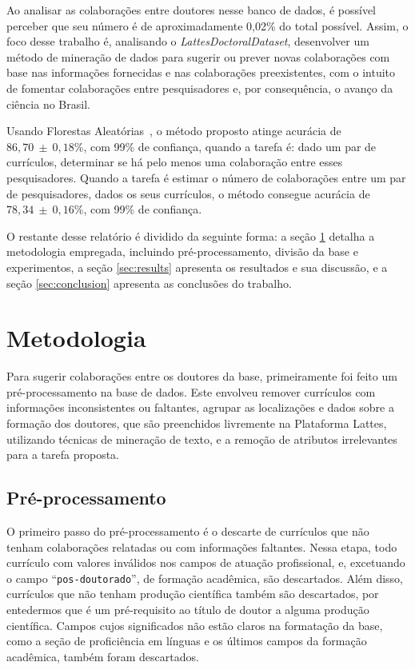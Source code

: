 \documentclass[12pt]{article}
\begin{document}
Ao analisar as colaborações entre doutores nesse banco de dados, é possível perceber que seu número é de aproximadamente 0,02\% do total possível.
Assim, o foco desse trabalho é, analisando o \emph{LattesDoctoralDataset}, desenvolver um método de mineração de dados para sugerir ou prever novas colaborações com base nas informações fornecidas e nas colaborações preexistentes, com o intuito de fomentar colaborações entre pesquisadores e, por consequência, o avanço da ciência no Brasil.

Usando Florestas Aleatórias~\cite{random-forests}, o método proposto atinge acurácia de $86,70~\pm~0,18$\%, com 99\% de confiança, quando a tarefa é: dado um par de currículos, determinar se há pelo menos uma colaboração entre esses pesquisadores.
Quando a tarefa é estimar o número de colaborações entre um par de pesquisadores, dados os seus currículos, o método consegue acurácia de $78,34~\pm~0,16$\%, com 99\% de confiança.

O restante desse relatório é dividido da seguinte forma: a seção \ref{sec:methods} detalha a metodologia empregada, incluindo pré-processamento, divisão da base e experimentos, a seção \ref{sec:results} apresenta os resultados e sua discussão, e a seção \ref{sec:conclusion} apresenta as conclusões do trabalho.

\section{Metodologia}
\label{sec:methods}

Para sugerir colaborações entre os doutores da base, primeiramente foi feito um pré-processamento na base de dados.
Este envolveu remover currículos com informações inconsistentes ou faltantes, agrupar as localizações e dados sobre a formação dos doutores, que são preenchidos livremente na Plataforma Lattes, utilizando técnicas de mineração de texto, e a remoção de atributos irrelevantes para a tarefa proposta.

\subsection{Pré-processamento}
\label{sec:preprocess}

O primeiro passo do pré-processamento é o descarte de currículos que não tenham colaborações relatadas ou com informações faltantes.
Nessa etapa, todo currículo com valores inválidos nos campos de atuação profissional, e, excetuando o campo ``\texttt{pos-doutorado}'', de formação acadêmica, são descartados.
Além disso, currículos que não tenham produção científica também são descartados, por entedermos que é um pré-requisito ao título de doutor a alguma produção científica.
Campos cujos significados não estão claros na formatação da base, como a seção de proficiência em línguas e os últimos campos da formação acadêmica, também foram descartados.
\end{document}
